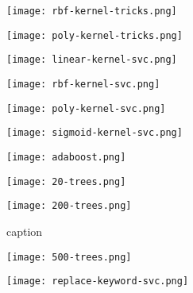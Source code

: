 \begin{figure}[h]
  \centering
  \texttt{[image: rbf-kernel-tricks.png]}
  \caption{}
  \label{fig:rbf-kernel-tricks}
\end{figure}

\begin{figure}[h]
  \centering
  \texttt{[image: poly-kernel-tricks.png]}
  \caption{}
  \label{fig:poly-kernel-tricks}
\end{figure}

\begin{figure}[h]
  \centering
  \texttt{[image: linear-kernel-svc.png]}
  \caption{}
  \label{fig:linear-kernel-svc}
\end{figure}

\begin{figure}[h]
  \centering
  \texttt{[image: rbf-kernel-svc.png]}
  \caption{}
  \label{fig:rbf-kernel-svc}
\end{figure}

\begin{figure}[h]
  \centering
  \texttt{[image: poly-kernel-svc.png]}
  \caption{}
  \label{fig:poly-kernel-svc}
\end{figure}

\begin{figure}[h]
  \centering
  \texttt{[image: sigmoid-kernel-svc.png]}
  \caption{}
  \label{fig:sigmoid-kernel-svc}
\end{figure}

\begin{figure}[h]
  \centering
  \texttt{[image: adaboost.png]}
  \caption{}
  \label{fig:adaboost}
\end{figure}

\begin{figure}[h]
  \centering
  \texttt{[image: 20-trees.png]}
  \caption{}
  \label{fig:20-trees}
\end{figure}

\begin{figure}[h]
  \centering
  \texttt{[image: 200-trees.png]}
  \caption{caption}
  \label{fig:200-trees}
\end{figure}

\begin{figure}[h]
  \centering
  \texttt{[image: 500-trees.png]}
  \caption{}
  \label{fig:500-trees}
\end{figure}

\begin{figure}[h]
  \centering
  \texttt{[image: replace-keyword-svc.png]}
  \caption{}
  \label{fig:replace-keyword-svc}
\end{figure}

